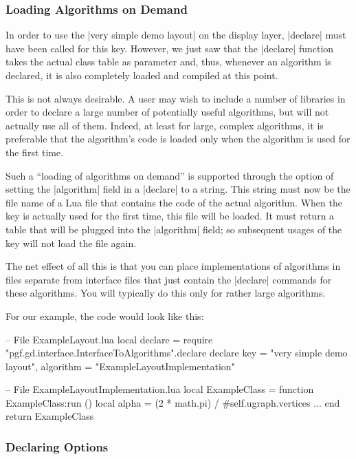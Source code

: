 \subsubsection{Loading Algorithms on Demand}

In order to use the |very simple demo layout| on the display layer,
|declare| must have been called for this key. However, we just saw
that the |declare| function takes the actual class table as parameter
and, thus, whenever an algorithm is declared, it is also completely
loaded and compiled at this point.

This is not always desirable. A user may wish to include a number of
libraries in order to declare a large number of potentially useful
algorithms, but will not actually use all of them. Indeed, at least
for large, complex algorithms, it is preferable that the algorithm's
code is loaded only when the algorithm is used for the first time.

Such a ``loading of algorithms on demand'' is supported through the
option of setting the |algorithm| field in a |declare| to a
string. This string must now be the file name of a Lua file that
contains the code of the actual algorithm. When the key is actually
used for the first time, this file will be loaded. It must return a
table that will be plugged into the |algorithm| field; so subsequent
usages of the key will not load the file again.

The net effect of all this is that you can place implementations of
algorithms in files separate from interface files that just contain
the |declare| commands for these algorithms. You will typically do
this only for rather large algorithms.

For our example, the code would look like this:

\begin{codeexample}
-- File ExampleLayout.lua
local declare = require "pgf.gd.interface.InterfaceToAlgorithms".declare  
declare {
  key = "very simple demo layout",
  algorithm = "ExampleLayoutImplementation"
}
\end{codeexample}

\begin{codeexample}
-- File ExampleLayoutImplementation.lua
local ExampleClass = {}
function ExampleClass:run ()
  local alpha = (2 * math.pi) / #self.ugraph.vertices
  ...
end
return ExampleClass
\end{codeexample}


\subsubsection{Declaring Options}

